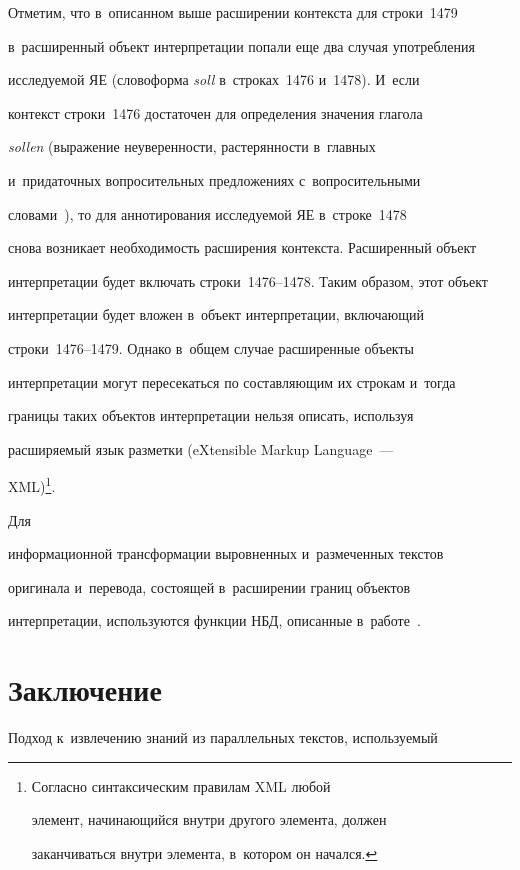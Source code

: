  Отметим, что в~описанном выше расширении контекста для строки~1479 


в~расширенный объект интерпретации попали еще два случая употребления 


исследуемой ЯЕ (словоформа \textit{soll} в~строках~1476 и~1478). И~если 


контекст строки~1476 достаточен для определения значения глагола 


\textit{sollen} (выражение неуверенности, растерянности в~главных 


и~придаточных вопросительных предложениях с~вопросительными 


словами~\cite{8-gz}), то для аннотирования исследуемой ЯЕ в~строке~1478 


снова возникает необходимость расширения контекста. Расширенный объект 


интерпретации будет включать строки~1476--1478. Таким образом, этот объект 


интерпретации будет вложен в~объект интерпретации, включающий 


строки~1476--1479. Однако в~общем случае расширенные объекты 


интерпретации могут пересекаться по составляющим их строкам и~тогда 


границы таких объектов интерпретации нельзя описать, используя 


расширяемый язык разметки (eXtensible Markup Language~--- 


XML)\footnote{Согласно синтаксическим правилам XML любой 


элемент, начинающийся внутри другого элемента, должен 


заканчиваться внутри элемента, в~котором он начался.}.


 Для 


информационной трансформации выровненных и~размеченных текстов 


оригинала и~перевода, состоящей в~расширении границ объектов 


интерпретации, используются функции НБД, описанные в~работе~\cite{24-gz}.





\section{Заключение}





  Подход к~извлечению знаний из параллельных текстов, используемый 


